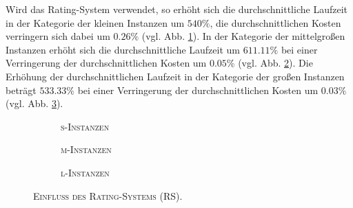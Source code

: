 Wird das Rating-System verwendet, so erhöht sich die durchschnittliche Laufzeit in der Kategorie der kleinen Instanzen
um $540 \%$, die durchschnittlichen Kosten verringern sich dabei um $0.26 \%$ (vgl. Abb. \ref{fig:rs_impact_a}).
In der Kategorie der mittelgroßen Instanzen erhöht sich die durchschnittliche Laufzeit um $611.11 \%$ bei einer
Verringerung der durchschnittlichen Kosten um $0.05 \%$ (vgl. Abb. \ref{fig:rs_impact_b}).
Die Erhöhung der durchschnittlichen Laufzeit in der Kategorie der großen Instanzen beträgt $533.33 \%$
bei einer Verringerung der durchschnittlichen Kosten um $0.03 \%$ (vgl. Abb. \ref{fig:rs_impact_c}).

\begin{figure}[H]
\centering
\begin{subfigure}[b]{0.325\textwidth}
\centering
{}
\caption{\textsc{s-Instanzen}}
\label{fig:rs_impact_a}
\end{subfigure}
\begin{subfigure}[b]{0.325\textwidth}
\centering
{}
\caption{\textsc{m-Instanzen}}
\label{fig:rs_impact_b}
\end{subfigure}
\begin{subfigure}[b]{0.325\textwidth}
\centering
{}
\caption{\textsc{l-Instanzen}}
\label{fig:rs_impact_c}
\end{subfigure}
\caption{\textsc{Einfluss des Rating-Systems (RS).}}
\label{fig:impact_of_rating_system}
\end{figure}

